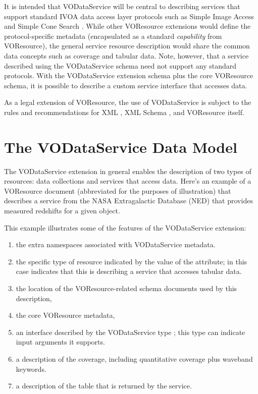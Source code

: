 \documentclass[11pt,a4paper]{ivoa}
\begin{document}
It is intended that VODataService will be central to describing
services that support standard IVOA data access layer protocols such
as Simple Image Access \citep{2015ivoa.spec.1223D} and Simple Cone Search
\citep{2008ivoa.specQ0222P}.  While other VOResource extensions would
define the protocol-specific metadata (encapsulated as a standard
\emph{capability} from VOResource), the general service
resource description would share the common data concepts such as
coverage and tabular data.  Note, however, that a service described
using the VODataService schema need not support any standard
protocols.  With the VODataService extension schema plus the core
VOResource schema, it is possible to describe a custom service
interface that accesses data.  



As a legal extension of VOResource, the use
of VODataService is subject to the rules and recommendations for XML
\citep{std:XML}, XML Schema \citep{std:XSD},
and VOResource itself.  


\section{The VODataService Data Model}


The VODataService extension in general enables the description of two
types of resources:  data collections and services that access data.
Here's an example of a VOResource document (abbreviated for the
purposes of illustration) that describes a service from the NASA
Extragalactic Database (NED) that provides measured redshifts for a
given object.




This example illustrates some of the features of the VODataService
extension:

\begin{enumerate}
\item the extra namespaces associated with
       VODataService metadata.
\item the specific type of resource indicated by
       the value of the  attribute; in this case
        indicates that this is
       describing a service that accesses tabular data.
\item the location of the VOResource-related schema 
       documents used by this description,
\item the core VOResource metadata,
\item an interface described by the
       VODataService type ; this
       type can indicate input arguments it supports.
\item a description of the
       coverage, including quantitative coverage
       plus waveband keywords.
\item a description of the table that is returned
       by the service.
\end{enumerate}
\end{document}
